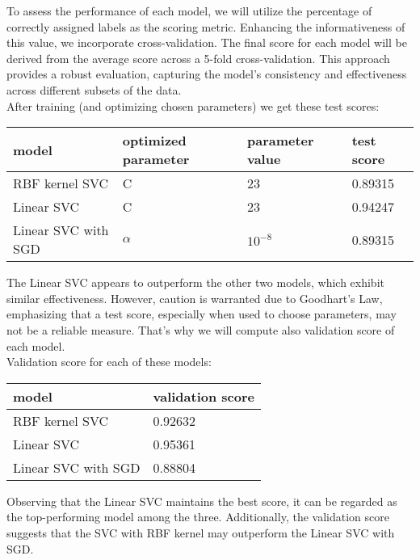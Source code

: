 \documentclass[a4paper]{article}
\begin{document}
	To assess the performance of each model, we will utilize the percentage of correctly assigned labels as the scoring metric. Enhancing the informativeness of this value, we incorporate cross-validation. The final score for each model will be derived from the average score across a 5-fold cross-validation. This approach provides a robust evaluation, capturing the model's consistency and effectiveness across different subsets of the data.
	\\
	
	After training (and optimizing chosen parameters) we get these test scores:
	
		\begin{table}[!h]
			\begin{tabular}{|l|l|l|l|}
				\hline
				model & optimized parameter & parameter value & test score  \\ \hline
				RBF kernel SVC & C & 23 & 0.89315 \\ \hline
				Linear SVC & C & 23 & 0.94247 \\ \hline
				Linear SVC with SGD& $\alpha$ & $10^{-8}$ & 0.89315 \\ \hline
			\end{tabular}
	\end{table} 

	The Linear SVC appears to outperform the other two models, which exhibit similar effectiveness. However, caution is warranted due to Goodhart's Law, emphasizing that a test score, especially when used to choose parameters, may not be a reliable measure. That's why we will compute also validation score of each model.
	\\
	
	Validation score for each of these models:
	
	\begin{table}[!h]
		\begin{tabular}{|l|l|}
			\hline
			model &  validation score  \\ \hline
			RBF kernel SVC & 0.92632 \\ \hline
			Linear SVC & 0.95361 \\ \hline
			Linear SVC with SGD &  0.88804 \\ \hline
		\end{tabular}
	\end{table} 

	
	Observing that the Linear SVC maintains the best score, it can be regarded as the top-performing model among the three. Additionally, the validation score suggests that the SVC with RBF kernel may outperform the Linear SVC with SGD. 
	\\
	
\end{document}
